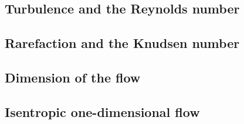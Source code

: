 \subsection{Turbulence and the Reynolds number}


\subsection{Rarefaction and the Knudsen number}


\subsection{Dimension of the flow}


\subsection{Isentropic one-dimensional flow}

